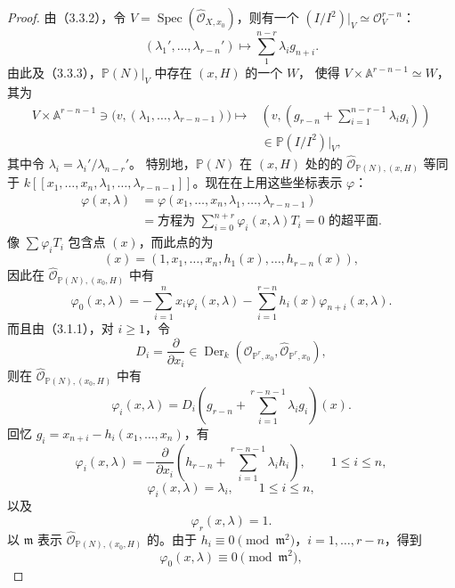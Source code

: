 \begin{proof}
由（3.3.2），令 $V=\operatorname{Spec}(\widehat{\mathcal O}_{X,x_0})$，则有一个 $(I/I^2)|_V\simeq\mathcal O_V^{r-n}$：
\[
(\lambda_1',\ldots,\lambda_{r-n}')\longmapsto\sum_{1}^{n-r}\lambda_i g_{n+i}.
\tag{3.3.4}
\]
由此及（3.3.3），$\mathbb P(N)|_V$ 中存在 $(x,H)$ 的一个 $W$，
使得 $V\times\mathbb A^{r-n-1}\simeq W$，其为
\[
\begin{split}
V\times\mathbb A^{r-n-1}\ni\bigl(v,(\lambda_1,\ldots,\lambda_{r-n-1})\bigr)
\longmapsto{}&\left(v,\left(g_{r-n}+\sum_{i=1}^{n-r-1}\lambda_i g_i\right)\right)\\
&\in\mathbb P(I/I^2)|_V,
\end{split}\tag{3.3.5}
\]
其中令 $\lambda_i=\lambda_i'/\lambda_{n-r}'$。
特别地，$\mathbb P(N)$ 在 $(x,H)$ 处的的 $\widehat{\mathcal O}_{\mathbb P(N),(x,H)}$ 等同于 $k[[x_1,\ldots,x_n,\lambda_1,\ldots,\lambda_{r-n-1}]]$。现在在上用这些坐标表示 $\varphi$：
\[
\begin{split}
\varphi(x,\lambda)&=\varphi(x_1,\ldots,x_n,\lambda_1,\ldots,\lambda_{r-n-1})\\
&=\text{方程为 }\sum_{i=0}^{n+r}\varphi_i(x,\lambda)T_i=0\text{ 的超平面}.
\end{split}\tag{3.3.6}
\]
像 $\sum\varphi_iT_i$ 包含点 $(x)$，而此点的为
\[
(x)=(1,x_1,\ldots,x_n,h_1(x),\ldots,h_{r-n}(x)),\tag{3.3.7}
\]
因此在 $\widehat{\mathcal O}_{\mathbb P(N),(x_0,H)}$ 中有
\[
\varphi_0(x,\lambda)=-\sum_{i=1}^{n}x_i\varphi_i(x,\lambda)-\sum_{i=1}^{r-n}h_i(x)\varphi_{n+i}(x,\lambda).
\tag{3.3.8}
\]
而且由（3.1.1），对 $i\geq1$，令
\[
D_i=\frac{\partial}{\partial x_i}\in\operatorname{Der}_k(\mathcal O_{\mathbb P^r,x_0},\widehat{\mathcal O}_{\mathbb P^r,x_0}),
\]
则在 $\widehat{\mathcal O}_{\mathbb P(N),(x_0,H)}$ 中有
\[
\varphi_i(x,\lambda)=D_i\left(g_{r-n}+\sum_{i=1}^{r-n-1}\lambda_i g_i\right)(x).
\tag{3.3.9}
\]
回忆 $g_i=x_{n+i}-h_i(x_1,\ldots,x_n)$，有
\[
\varphi_i(x,\lambda)=-\frac{\partial}{\partial x_i}\left(h_{r-n}+\sum_{i=1}^{r-n-1}\lambda_i h_i\right),\qquad1\leq i\leq n,
\tag{3.3.10}
\]
\[
\varphi_i(x,\lambda)=\lambda_i,\qquad1\leq i\leq n,\tag{3.3.11}
\]
以及
\[
\varphi_r(x,\lambda)=1.\tag{3.3.12}
\]
以 $\mathfrak m$ 表示 $\widehat{\mathcal O}_{\mathbb P(N),(x_0,H)}$ 的。由于 $h_i\equiv0\pmod{\mathfrak m^2}$，$i=1,\ldots,r-n$，得到
\[
\varphi_0(x,\lambda)\equiv0\pmod{\mathfrak m^2},\tag{3.3.13}
\]
\end{proof}
